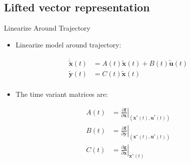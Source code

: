 \documentclass{beamer}
\newcommand{\state}{\mathbf{x}} %
\newcommand{\sysInput}{\mathbf{u}} %
\newcommand{\observations}{\mathbf{y}} %
\newcommand\at[2]{\left.#1\right|_{#2}} %
\begin{document}
\subsection{Lifted vector representation}
%
\begin{frame}{Linearize Around Trajectory}
\begin{itemize}
\item Linearize model around trajectory: \pause
\end{itemize}
\begin{equation*}
\begin{aligned}
\dot{\tilde{\state}}(t) &= A(t)\tilde{\state}(t) + B(t)\tilde{\sysInput}(t) \\
\tilde{\observations}(t) &= C(t)\tilde{\state}(t) \\
\end{aligned}
\end{equation*} \pause
\begin{itemize}
\item The time variant matrices are: \pause
\linebreak
\end{itemize}
\begin{equation*}
\begin{aligned}
A(t) & = \at{\frac{\partial{\mathbf{f}}}{\partial{\state}}}{(\state^{*}(t),\sysInput^{*}(t))} \\
B(t) & = \at{\frac{\partial{\mathbf{f}}}{\partial{\observations}}}{(\state^{*}(t),\sysInput^{*}(t))} \\
C(t) & = \at{\frac{\partial{\mathbf{g}}}{\partial{\state}}}{\state^{*}(t)} \\
\end{aligned}
\end{equation*}
\end{frame}
%
\end{document}
